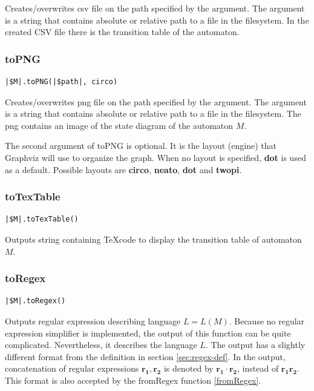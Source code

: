 \documentclass{ctuthesis}
\begin{document}
Creates/overwrites csv file on the path specified by the argument. The argument is a string that contains absolute or relative path to a file in the filesystem. In the created CSV file there is the transition table of the automaton.

\subsubsection{toPNG}
\begin{lstlisting}[language = JASL_snippet]
	|$M|.toPNG(|$path|, circo)
\end{lstlisting}

Creates/overwrites png file on the path specified by the argument. The argument is a string that contains absolute or relative path to a file in the filesystem. The png contains an image of the state diagram of the automaton $M$. 

The second argument of toPNG is optional. It is the layout (engine) that Graphviz will use to organize the graph. When no layout is specified, \textbf{dot} is used as a default. Possible layouts are \textbf{circo}, \textbf{neato}, \textbf{dot} and \textbf{twopi}.

\subsubsection{toTexTable}
\begin{lstlisting}[language = JASL_snippet]
	|$M|.toTexTable()
\end{lstlisting}

Outputs string containing \TeX code to display the transition table of automaton $M$. 

\subsubsection{toRegex}
\label{toRegex}
\begin{lstlisting}[language = JASL_snippet]
	|$M|.toRegex()
\end{lstlisting}

Outputs regular expression describing language $L = L(M)$. Because no regular expression simplifier is implemented, the output of this function can be quite complicated. Nevertheless, it describes the language $L$. The output has a slightly different format from the definition in section \ref{sec:regex-def}. In the output, concatenation of regular expressions $\mathbf{r_1}, \mathbf{r_2}$ is denoted by $\mathbf{r_1}\cdot \mathbf{r_2}$, instead of $\mathbf{r_1r_2}$. This format is also accepted by the fromRegex function \ref{fromRegex}.
\end{document}
